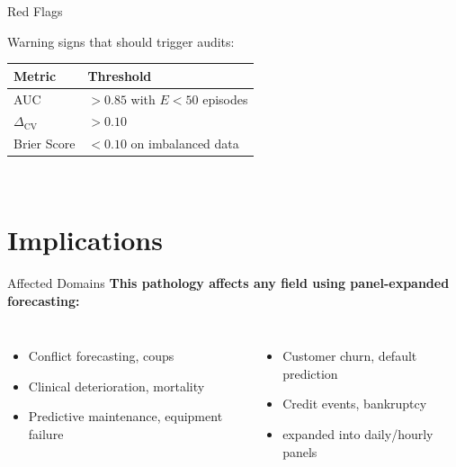 \documentclass[aspectratio=169]{beamer}
\begin{document}
\begin{frame}{Red Flags}
\begin{center}
\Large\alert{Warning signs that should trigger audits:}

\vspace{1em}
\begin{tabular}{ll}
\toprule
\textbf{Metric} & \textbf{Threshold} \\
\midrule
AUC & $> 0.85$ with $E < 50$ episodes \\
$\Delta_{\text{CV}}$ & $> 0.10$ \\
Brier Score & $< 0.10$ on imbalanced data \\
\bottomrule
\end{tabular}

\vspace{2em}
\\
\end{center}
\end{frame}

\section{Implications}

\begin{frame}{Affected Domains}
\textbf{This pathology affects any field using panel-expanded forecasting:}

\vspace{0.5em}
\begin{columns}[T]
\begin{itemize}
\item {} Conflict forecasting, coups
\item {} Clinical deterioration, mortality
\item {} Predictive maintenance, equipment failure
\end{itemize}

\begin{itemize}
\item {} Customer churn, default prediction
\item {} Credit events, bankruptcy
\item {} expanded into daily/hourly panels
\end{itemize}
\end{columns}

\vspace{1em}
\begin{center}
\end{center}
\end{frame}
\end{document}
